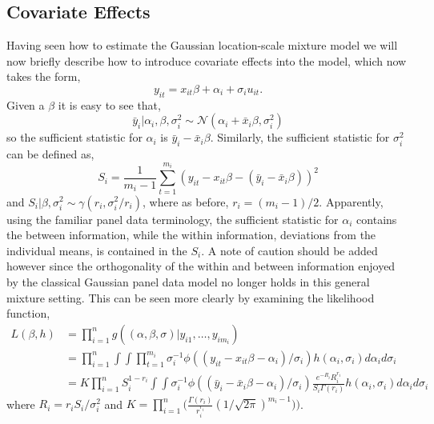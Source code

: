 \documentclass[12pt]{amsart}
\begin{document}
\subsection{Covariate Effects}
Having seen how to estimate the Gaussian location-scale mixture model we will now
briefly describe how to introduce covariate effects into the model, which now takes the form,
\[
y_{it} = x_{it} \beta + \alpha_{i} + \sigma_{i} u_{it}.
\]
Given a $\beta$ it is easy to see that,
\[
\bar y_{i} | \alpha_{i}, \beta, \sigma_{i}^{2} \sim 
\mathcal{N}(\alpha_{i} + \bar x_{i} \beta, \sigma_{i}^{2})
\]
so the sufficient statistic for $\alpha_{i}$ is $\bar y_{i} - \bar x_{i} \beta$. 
Similarly, the sufficient statistic for $\sigma_{i}^{2}$ can be defined as,  
\[
S_{i} = \frac{1}{m_{i}-1} \sum_{t=1}^{m_{i}} ( y_{it} - x_{it} \beta - (\bar y_{i} - \bar x_{i} \beta))^{2}
\]
and $S_{i} | \beta, \sigma_{i}^{2} \sim \gamma (r_{i}, \sigma_{i}^{2}/r_{i})$, 
where as before, $r_{i} = (m_{i}-1)/2$. Apparently, using the familiar panel data terminology, 
the sufficient statistic for $\alpha_{i}$ contains the between information, while the 
within information, deviations from the individual means, is contained in the $S_{i}$. 
A note of caution should be added however since the orthogonality of the within and between 
information enjoyed by the classical Gaussian panel data model no longer holds in this 
general mixture setting. This can be seen more clearly by examining the likelihood function, 
\begin{align*}
L(\beta, h) &= \prod _{i=1}^{n} g ((\alpha, \beta, \sigma) | y_{i1}, \dots, y_{im_{i}}) \\
& = \prod_{i=1}^{n} \int \int \prod_{t=1}^{m_{i}} \sigma_i^{-1}
\phi((y_{it} - x_{it} \beta - \alpha_{i})/\sigma_{i})
h(\alpha_{i}, \sigma_{i}) d\alpha_{i} d\sigma_{i}\\
& = K \prod_{i=1}^{n}S_{i} ^{1-r_{i}} \int \int \sigma_i^{-1} 
\phi((\bar y_{i} - \bar x_{i} \beta - \alpha_{i})/\sigma_{i}) 
\frac{e^{-R_{i}}R_{i}^{r_{i}}}{S_{i} \Gamma(r_{i})} h(\alpha_{i}, \sigma_{i}) d\alpha_{i} d\sigma_{i} 
\end{align*} 
where $R_{i} = r_{i} S_{i} / \sigma_{i}^{2}$ and $K = \prod_{i=1}^{n}
\Big ( \frac{\Gamma(r_{i})}{r_{i}^{r_{i}}} (1/\sqrt{2\pi})^{m_{i}-1} ) \Big)$. 
\end{document}
